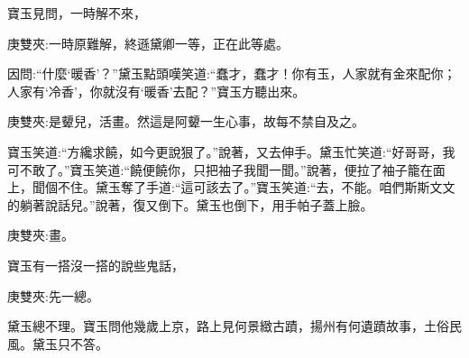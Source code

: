 \begin{parag}
    寶玉見問，一時解不來，\begin{note}庚雙夾:一時原難解，終遜黛卿一等，正在此等處。\end{note}因問:“什麼‘暖香’？”黛玉點頭嘆笑道:“蠢才，蠢才！你有玉，人家就有金來配你；人家有‘冷香’，你就沒有‘暖香’去配？”寶玉方聽出來。\begin{note}庚雙夾:是顰兒，活畫。然這是阿顰一生心事，故每不禁自及之。\end{note}寶玉笑道:“方纔求饒，如今更說狠了。”說著，又去伸手。黛玉忙笑道:“好哥哥，我可不敢了。”寶玉笑道:“饒便饒你，只把袖子我聞一聞。”說著，便拉了袖子籠在面上，聞個不住。黛玉奪了手道:“這可該去了。”寶玉笑道:“去，不能。咱們斯斯文文的躺著說話兒。”說著，復又倒下。黛玉也倒下，用手帕子蓋上臉。\begin{note}庚雙夾:畫。\end{note}寶玉有一搭沒一搭的說些鬼話，\begin{note}庚雙夾:先一總。\end{note}黛玉總不理。寶玉問他幾歲上京，路上見何景緻古蹟，揚州有何遺蹟故事，土俗民風。黛玉只不答。
\end{parag}


